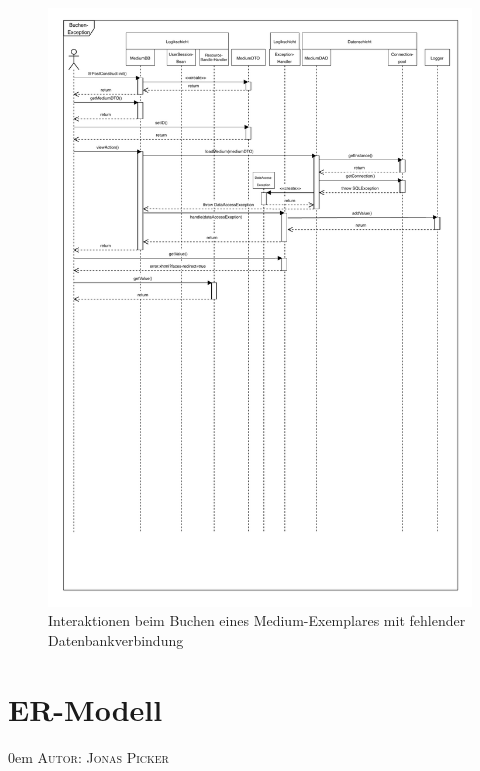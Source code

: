 \documentclass{article}
\makeatletter
\newcommand{\sectionauthor}[1]{
	{\parindent 0em \large \scshape Autor: #1 \par \nobreak \vspace*{1em}}
	\@afterheading
}
\makeatother
\begin{document}
\begin{figure}[h]
    \centering
    \includegraphics[width = 50em]{Sequenzdiagramm-exception-v2}
    \caption{Interaktionen beim Buchen eines Medium-Exemplares mit fehlender Datenbankverbindung}
    \label{Sequenzdiagramm}
\end{figure}

\restoregeometry
\newpage

\section{ER-Modell}
\sectionauthor{Jonas Picker}

\newpage
{}
\end{document}

